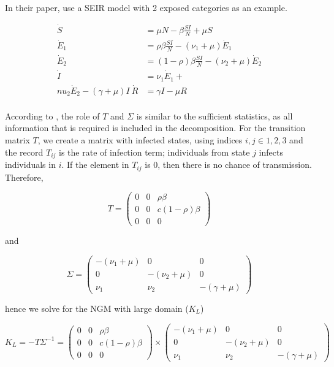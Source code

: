 \documentclass[12pt]{article}
\begin{document}
In their paper, \cite[p.875]{Diekmann:2010} use a SEIR model with 2 exposed categories as an example.

\begin{align*}
\dot{S} & =  \mu N - \beta\frac{SI}{N} + \mu S \\
\dot{E}_{1}  & =  \rho \beta \frac{SI}{N} - (\nu_{1} + \mu)\dot{E}_{1} \\
\dot{E}_{2}  & =  (1 - \rho) \beta \frac{SI}{N} - (\nu_{2} + \mu)\dot{E}_{2}\\
\dot{I}  & =  \nu_{1} \dot{E}_{1}  + \\nu_{2} \dot{E}_{2}  - (\gamma + \mu) I\
\dot{R}  & =  \gamma I - \mu R\\
\end{align*}

According to \cite{Diekmann:2010}, the role of $T$ and $\Sigma$ is similar to the sufficient statistics, as all information that is required is included in the decomposition. For the transition matrix $T$, we create a matrix with infected states, using indices $i, j\in {1, 2, 3}$ and the record $T_{ij}$ is the rate of infection term; individuals from state $j$ infects individuals in $i$. If the element in $T_{ij}$ is 0, then there is no chance of transmission.  Therefore, 

\begin{equation*}
T=
\begin{pmatrix}
0 & 0 & \rho \beta\\
0 & 0 & c (1-\rho)\beta\\
0 & 0 & 0
\end{pmatrix}
\end{equation*}

and 

\begin{equation*}
\Sigma=
\begin{pmatrix}
-(\nu_{1}+\mu) & 0 & 0\\
0 & -(\nu_{2}+\mu) & 0\\
\nu_{1} &  \nu_{2}& -(\gamma + \mu)
\end{pmatrix}
\end{equation*}

hence we solve for the NGM with large domain ($K_{L}$)

\begin{equation*}
K_{L} = -T\Sigma^{-1} = 
\begin{pmatrix}
0 & 0 & \rho \beta\\
0 & 0 & c (1-\rho)\beta\\
0 & 0 & 0
\end{pmatrix}
\times
\begin{pmatrix}
-(\nu_{1}+\mu) & 0 & 0\\
0 & -(\nu_{2}+\mu) & 0\\
\nu_{1} &  \nu_{2}& -(\gamma + \mu)
\end{pmatrix}
\end{equation*}
\end{document}
